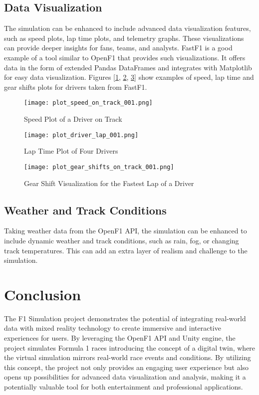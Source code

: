 \documentclass[
	a4paper, %
	10pt, %
	unnumberedsections, %
	twoside, %
]{LTJournalArticle}
\begin{document}
\subsection{Data Visualization}
The simulation can be enhanced to include advanced data visualization features, such as speed plots, lap time plots, and telemetry graphs. These visualizations can provide deeper insights for fans, teams, and analysts. FastF1 \autocite{fastF1} is a good example of a tool similar to OpenF1 that provides such visualizations. It offers data in the form of extended Pandas DataFrames and integrates with Matplotlib for easy data visualization. Figures [\ref{fig:speed_plot}, \ref{fig:lap_time_plot}, \ref{fig:gear_shifts_plot}] show examples of speed, lap time and gear shifts plots for drivers taken from FastF1.

\begin{figure}[h]
	\texttt{[image: plot\_speed\_on\_track\_001.png]}
	\caption{Speed Plot of a Driver on Track}
    \label{fig:speed_plot}
\end{figure}

\begin{figure}[h]
    \texttt{[image: plot\_driver\_lap\_001.png]}
    \caption{Lap Time Plot of Four Drivers}
    \label{fig:lap_time_plot}
\end{figure}

\begin{figure}[h]
    \texttt{[image: plot\_gear\_shifts\_on\_track\_001.png]}
    \caption{Gear Shift Visualization for the Fastest Lap of a Driver}
    \label{fig:gear_shifts_plot}
\end{figure}

\subsection{Weather and Track Conditions}
Taking weather data from the OpenF1 API, the simulation can be enhanced to include dynamic weather and track conditions, such as rain, fog, or changing track temperatures. This can add an extra layer of realism and challenge to the simulation.

\section{Conclusion}
The F1 Simulation project demonstrates the potential of integrating real-world data with mixed reality technology to create immersive and interactive experiences for users. By leveraging the OpenF1 API and Unity engine, the project simulates Formula 1 races introducing the concept of a digital twin, where the virtual simulation mirrors real-world race events and conditions. By utilizing this concept, the project not only provides an engaging user experience but also opens up possibilities for advanced data visualization and analysis, making it a potentially valuable tool for both entertainment and professional applications.

\printbibliography
\end{document}
